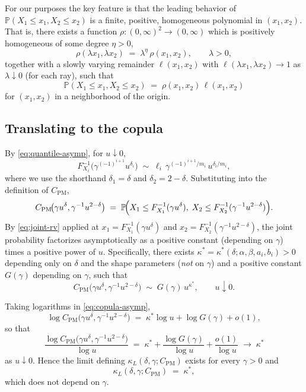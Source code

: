 \documentclass[11pt]{article}
\theoremstyle{definition}
\newcommand{\PM}{\mathrm{PM}}
\newcommand{\Prob}{\mathbb{P}}
\begin{document}
For our purposes the key feature is that the leading behavior of
$\Prob(X_1\le x_1,X_2\le x_2)$ is a finite, positive, homogeneous
polynomial in $(x_1,x_2)$. That is, there exists a function
$\rho:(0,\infty)^2\to(0,\infty)$ which is positively homogeneous of
some degree $\eta>0$,
\[
\rho(\lambda x_1,\lambda x_2) \;=\; \lambda^{\eta}\,\rho(x_1,x_2),
\qquad \lambda>0,
\]
together with a slowly varying remainder $\ell(x_1,x_2)$ with
$\ell(\lambda x_1,\lambda x_2)\to 1$ as $\lambda\downarrow 0$ (for each
ray), such that
\begin{equation}\label{eq:joint-rv}
\Prob(X_1\le x_1,X_2\le x_2)
\;=\; \rho(x_1,x_2)\,\ell(x_1,x_2)
\end{equation}
for $(x_1,x_2)$ in a neighborhood of the origin.

\subsection{Translating to the copula}

By \eqref{eq:quantile-asymp}, for $u\downarrow 0$,
\[
F_{X_i}^{-1}\!\bigl(\gamma^{(-1)^{i+1}}u^{\delta_i}\bigr)
\;\sim\; \ell_i\,\gamma^{(-1)^{i+1}/m_i}\,u^{\delta_i/m_i},
\]
where we use the shorthand $\delta_1=\delta$ and $\delta_2=2-\delta$.
Substituting into the definition of $C_{\PM}$,
\[
C_{\PM}\!\bigl(\gamma u^{\delta},\gamma^{-1}u^{2-\delta}\bigr)
\;=\;
\Prob\!\Bigl(X_1\le F_{X_1}^{-1}(\gamma u^{\delta}),\;
              X_2\le F_{X_2}^{-1}(\gamma^{-1}u^{2-\delta})\Bigr).
\]
By \eqref{eq:joint-rv} applied at $x_1=F_{X_1}^{-1}(\gamma u^{\delta})$
and $x_2=F_{X_2}^{-1}(\gamma^{-1}u^{2-\delta})$, the joint probability
factorizes asymptotically as a positive constant (depending on
$\gamma$) times a positive power of $u$. Specifically, there exists
$\kappa^*=\kappa^*(\delta;\alpha,\beta,a_i,b_i)>0$ depending only on
$\delta$ and the shape parameters (\emph{not} on $\gamma$) and a
positive constant $G(\gamma)$ depending on $\gamma$, such that
\begin{equation}\label{eq:copula-asymp}
C_{\PM}\!\bigl(\gamma u^{\delta},\gamma^{-1}u^{2-\delta}\bigr)
\;\sim\; G(\gamma)\, u^{\kappa^*}, \qquad u\downarrow 0.
\end{equation}

Taking logarithms in \eqref{eq:copula-asymp},
\[
\log C_{\PM}\!\bigl(\gamma u^{\delta},\gamma^{-1}u^{2-\delta}\bigr)
\;=\; \kappa^*\log u + \log G(\gamma) + o(1),
\]
so that
\[
\frac{\log C_{\PM}\!\bigl(\gamma u^{\delta},\gamma^{-1}u^{2-\delta}\bigr)}{\log u}
\;=\;
\kappa^* + \frac{\log G(\gamma)}{\log u} + \frac{o(1)}{\log u}
\;\longrightarrow\; \kappa^*
\]
as $u\downarrow 0$. Hence the limit defining
$\kappa_L(\delta,\gamma;C_{\PM})$ exists for every $\gamma>0$ and
\begin{equation}\label{eq:cpm-conclusion-direct}
\kappa_L(\delta,\gamma;C_{\PM}) \;=\; \kappa^*,
\end{equation}
which does not depend on $\gamma$.
\end{document}
